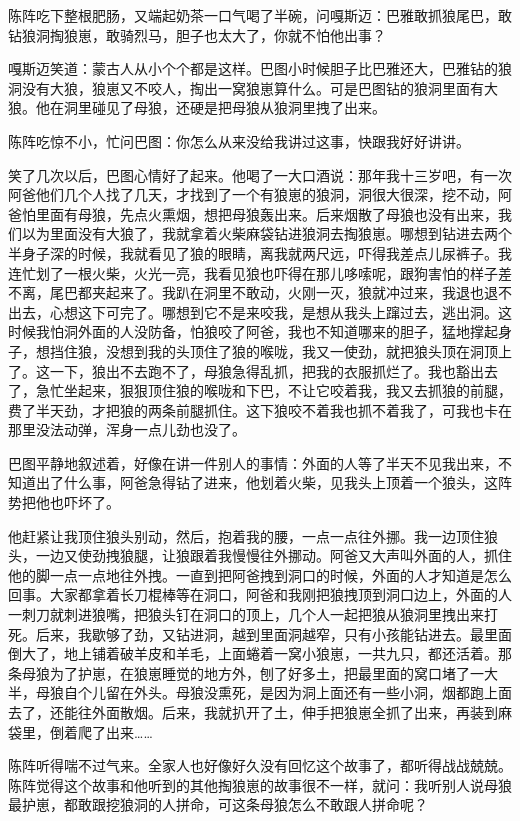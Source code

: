 \par 陈阵吃下整根肥肠，又端起奶茶一口气喝了半碗，问嘎斯迈：巴雅敢抓狼尾巴，敢钻狼洞掏狼崽，敢骑烈马，胆子也太大了，你就不怕他出事？
\par 嘎斯迈笑道：蒙古人从小个个都是这样。巴图小时候胆子比巴雅还大，巴雅钻的狼洞没有大狼，狼崽又不咬人，掏出一窝狼崽算什么。可是巴图钻的狼洞里面有大狼。他在洞里碰见了母狼，还硬是把母狼从狼洞里拽了出来。
\par 陈阵吃惊不小，忙问巴图：你怎么从来没给我讲过这事，快跟我好好讲讲。
\par 笑了几次以后，巴图心情好了起来。他喝了一大口酒说：那年我十三岁吧，有一次阿爸他们几个人找了几天，才找到了一个有狼崽的狼洞，洞很大很深，挖不动，阿爸怕里面有母狼，先点火熏烟，想把母狼轰出来。后来烟散了母狼也没有出来，我们以为里面没有大狼了，我就拿着火柴麻袋钻进狼洞去掏狼崽。哪想到钻进去两个半身子深的时候，我就看见了狼的眼睛，离我就两尺远，吓得我差点儿尿裤子。我连忙划了一根火柴，火光一亮，我看见狼也吓得在那儿哆嗦呢，跟狗害怕的样子差不离，尾巴都夹起来了。我趴在洞里不敢动，火刚一灭，狼就冲过来，我退也退不出去，心想这下可完了。哪想到它不是来咬我，是想从我头上蹿过去，逃出洞。这时候我怕洞外面的人没防备，怕狼咬了阿爸，我也不知道哪来的胆子，猛地撑起身子，想挡住狼，没想到我的头顶住了狼的喉咙，我又一使劲，就把狼头顶在洞顶上了。这一下，狼出不去跑不了，母狼急得乱抓，把我的衣服抓烂了。我也豁出去了，急忙坐起来，狠狠顶住狼的喉咙和下巴，不让它咬着我，我又去抓狼的前腿，费了半天劲，才把狼的两条前腿抓住。这下狼咬不着我也抓不着我了，可我也卡在那里没法动弹，浑身一点儿劲也没了。
\par 巴图平静地叙述着，好像在讲一件别人的事情：外面的人等了半天不见我出来，不知道出了什么事，阿爸急得钻了进来，他划着火柴，见我头上顶着一个狼头，这阵势把他也吓坏了。
\par 他赶紧让我顶住狼头别动，然后，抱着我的腰，一点一点往外挪。我一边顶住狼头，一边又使劲拽狼腿，让狼跟着我慢慢往外挪动。阿爸又大声叫外面的人，抓住他的脚一点一点地往外拽。一直到把阿爸拽到洞口的时候，外面的人才知道是怎么回事。大家都拿着长刀棍棒等在洞口，阿爸和我刚把狼拽顶到洞口边上，外面的人一刺刀就刺进狼嘴，把狼头钉在洞口的顶上，几个人一起把狼从狼洞里拽出来打死。后来，我歇够了劲，又钻进洞，越到里面洞越窄，只有小孩能钻进去。最里面倒大了，地上铺着破羊皮和羊毛，上面蜷着一窝小狼崽，一共九只，都还活着。那条母狼为了护崽，在狼崽睡觉的地方外，刨了好多土，把最里面的窝口堵了一大半，母狼自个儿留在外头。母狼没熏死，是因为洞上面还有一些小洞，烟都跑上面去了，还能往外面散烟。后来，我就扒开了土，伸手把狼崽全抓了出来，再装到麻袋里，倒着爬了出来……
\par 陈阵听得喘不过气来。全家人也好像好久没有回忆这个故事了，都听得战战兢兢。陈阵觉得这个故事和他听到的其他掏狼崽的故事很不一样，就问：我听别人说母狼最护崽，都敢跟挖狼洞的人拼命，可这条母狼怎么不敢跟人拼命呢？
